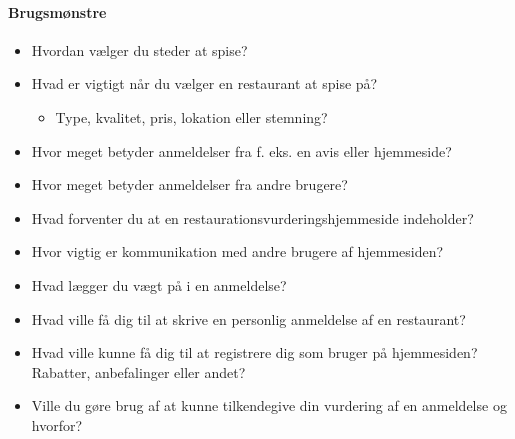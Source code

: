 \documentclass[a4paper, 12pt]{article}
\begin{document}
\paragraph{Brugsmønstre}
\begin{itemize}
\item Hvordan vælger du steder at spise?
\item Hvad er vigtigt når du vælger en restaurant at spise på?
  \begin{itemize}
  \item Type, kvalitet, pris, lokation eller stemning?
  \end{itemize}
\item Hvor meget betyder anmeldelser fra f. eks. en avis eller hjemmeside?
\item Hvor meget betyder anmeldelser fra andre brugere?
\item Hvad forventer du at en restaurationsvurderingshjemmeside indeholder?
\item Hvor vigtig er kommunikation med andre brugere af hjemmesiden?
\item Hvad lægger du vægt på i en anmeldelse?
\item Hvad ville få dig til at skrive en personlig anmeldelse af en restaurant?
\item Hvad ville kunne få dig til at registrere dig som bruger på hjemmesiden?
Rabatter, anbefalinger eller andet?
\item Ville du gøre brug af at kunne tilkendegive din vurdering af en anmeldelse
og hvorfor?
\end{itemize}

\printbibliography[heading=bibnumbered,title=Litteraturliste]
\end{document}
